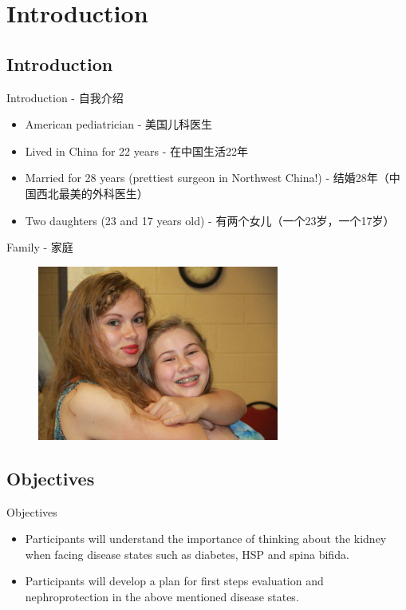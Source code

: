 \section{Introduction}\label{introduction}

\subsection{Introduction}\label{introduction-1}

\begin{frame}{Introduction - 自我介绍}

\begin{itemize}
\itemsep1pt\parskip0pt
\item
  American pediatrician - 美国儿科医生
\item
  Lived in China for 22 years - 在中国生活22年
\item
  Married for 28 years (prettiest surgeon in Northwest China!) -
  结婚28年（中国西北最美的外科医生）
\item
  Two daughters (23 and 17 years old) - 有两个女儿（一个23岁，一个17岁）
\end{itemize}

\end{frame}

\begin{frame}{Family - 家庭}

\begin{figure}
\includegraphics[scale=0.7]{./img/img_0002_300.jpg}
\end{figure}

\end{frame}

\subsection{Objectives}\label{objectives}

\begin{frame}{Objectives}

\begin{itemize}
\itemsep1pt\parskip0pt
\item
  Participants will understand the importance of thinking about the
  kidney when facing disease states such as diabetes, HSP and spina
  bifida.
\item
  Participants will develop a plan for first steps evaluation and
  nephroprotection in the above mentioned disease states.
\end{itemize}

\end{frame}

